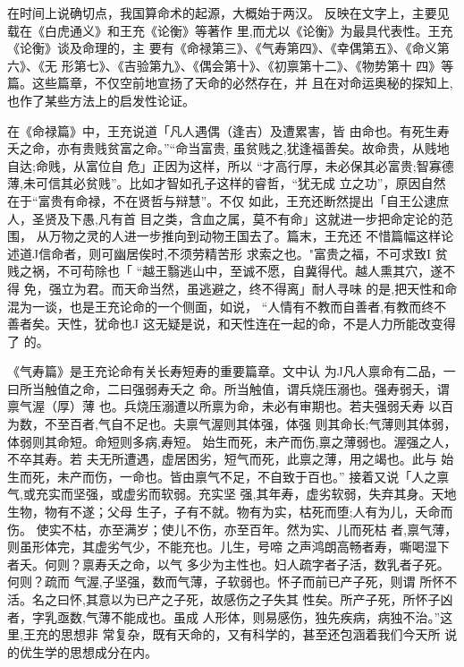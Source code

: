 在时间上说确切点，我国算命术的起源，大概始于两汉。
反映在文字上，主要见载在《白虎通义》和王充《论衡》等著作
里,而尤以《论衡》为最具代表性。王充《论衡》谈及命理的，主
要有《命禄第三》、《气寿第四》、《幸偶第五》、《命义第六》、《无
形第七》、《吉验第九》、《偶会第十》、《初禀第十二》、《物势第十
四》等篇。这些篇章，不仅空前地宣扬了天命的必然存在，并
且在对命运奥秘的探知上,也作了某些方法上的启发性论证。

在《命禄篇》中，王充说道「凡人遇偶（逢吉）及遭累害，皆
由命也。有死生寿夭之命，亦有贵贱贫富之命。”“命当富贵,
虽贫贱之,犹逢福善矣。故命贵，从贱地自达;命贱，从富位自
危」正因为这样，所以 “才高行厚，未必保其必富贵;智寡德
薄,未可信其必贫贱”。比如才智如孔子这样的睿哲，“犹无成
立之功”，原因自然在于“富贵有命禄，不在贤哲与辩慧”。不仅
如此，王充还断然提出「自王公逮庶人，圣贤及下愚,凡有首
目之类，含血之属，莫不有命」这就进一步把命定论的范围，
从万物之灵的人进一步推向到动物王国去了。篇末，王充还
不惜篇幅这样论述道J信命者，则可幽居俟时,不须劳精苦形
求索之也。"富贵之福，不可求致I 贫贱之祸，不可苟除也「
“越王翳逃山中，至诚不愿，自冀得代。越人熏其穴，遂不得
免，强立为君。而天命当然，虽逃避之，终不得离」耐人寻味
的是,把天性和命混为一谈，也是王充论命的一个侧面，如说，
“人情有不教而自善者,有教而终不善者矣。天性，犹命也J
这无疑是说，和天性连在一起的命，不是人力所能改变得了
的。

《气寿篇》是王充论命有关长寿短寿的重要篇章。文中认
为J凡人禀命有二品，一曰所当触值之命，二曰强弱寿夭之
命。所当触值，谓兵烧压溺也。强寿弱夭，谓禀气渥（厚）薄
也。兵烧压溺遭以所禀为命，未必有审期也。若夫强弱夭寿
以百为数，不至百者,气自不足也。夫禀气渥则其体强，体强
则其命长;气薄则其体弱，体弱则其命短。命短则多病,寿短。
始生而死，未产而伤,禀之薄弱也。渥强之人，不卒其寿。若
夫无所遭遇，虚居困劣，短气而死，此禀之薄，用之竭也。此与
始生而死，未产而伤，一命也。皆由禀气不足，不自致于百也。”
接着又说「人之禀气,或充实而坚强，或虚劣而软弱。充实坚
强,其年寿，虚劣软弱，失弃其身。天地生物，物有不遂；父母
生子，子有不就。物有为实，枯死而堕;人有为儿，夭命而伤。
使实不枯，亦至满岁；使儿不伤，亦至百年。然为实、儿而死枯
者,禀气薄，则虽形体完，其虚劣气少，不能充也。儿生，号啼
之声鸿朗高畅者寿，嘶喝湿下者夭。何则？禀寿夭之命，以气
多少为主性也。妇人疏字者子活，数乳者子死。何则？疏而
气渥,子坚强，数而气薄，子软弱也。怀子而前已产子死，则谓
所怀不活。名之曰怀,其意以为已产之子死，故感伤之子失其
性矣。所产子死，所怀子凶者，字乳亟数,气薄不能成也。虽成
人形体，则易感伤，独先疾病，病独不治。”这里,王充的思想非
常复杂，既有天命的，又有科学的，甚至还包涵着我们今天所
说的优生学的思想成分在内。

